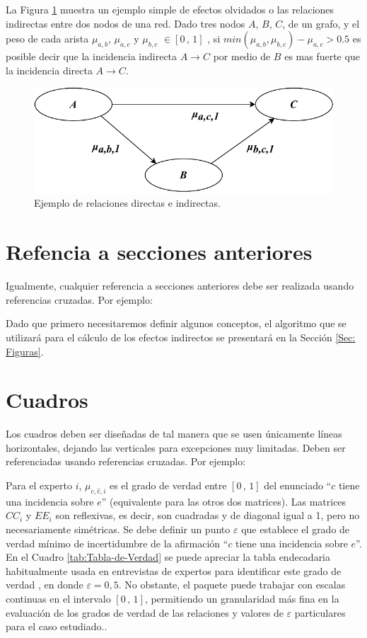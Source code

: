 La Figura \ref{figure: 1d_triangle} muestra un ejemplo simple de efectos olvidados o las relaciones indirectas entre dos nodos de una red. Dado tres nodos $A$, $B$, $C$, de un grafo, y el peso de cada arista $\mu_{a,b}$, $\mu_{a,c}$ y $\mu_{b,c}$ $\in [0\,,\,1]$ , si $min(\mu_{a,b}, \mu_{b,c}) - \mu_{a,c} > 0.5$ es posible decir que la incidencia indirecta $A \rightarrow C$ por medio de $B$ es mas fuerte que la incidencia directa $A \rightarrow C$.
\begin{figure}[H]
  \centering
  \includegraphics[width=\textwidth]{files/1d.pdf}
  \caption{Ejemplo de relaciones directas e indirectas.}
  \label{figure: 1d_triangle}
\end{figure}

\section{Refencia a secciones anteriores}
Igualmente, cualquier referencia a secciones anteriores debe ser realizada usando referencias cruzadas. Por ejemplo:

Dado que primero necesitaremos definir algunos conceptos, el algoritmo que se utilizará para el cálculo de los efectos indirectos se presentará en la Sección \ref{Sec: Figuras}. 

\section{Cuadros}

Los cuadros deben ser diseñadas de tal manera que se usen únicamente líneas horizontales, dejando las verticales para excepciones muy limitadas. Deben ser referenciadas usando referencias cruzadas. Por ejemplo:

Para el experto $i$, $\mu_{c,\hat{e},i}$ es el grado de verdad entre $[0\,,\,1]$ del enunciado ``$c$ tiene una incidencia sobre $e$'' (equivalente para las otros dos matrices). Las matrices $CC_i$ y $EE_i$ son reflexivas, es decir, son cuadradas y de diagonal igual a 1, pero no necesariamente simétricas. Se debe definir un punto $\varepsilon$ que establece el grado de verdad mínimo de incertidumbre de la afirmación ``$c$ tiene una incidencia sobre $e$''. En el Cuadro \ref{tab:Tabla-de-Verdad} se puede apreciar la tabla endecadaria habitualmente usada en entrevistas de expertos para identificar este grado de verdad \parencite{kaufmann1993tecnicas}, en donde $\varepsilon=0,5$. No obstante, el paquete puede trabajar con escalas continuas en el intervalo $[0\,,\,1]$, permitiendo un granularidad más fina en la evaluación de los grados de verdad de las relaciones y valores de $\varepsilon$ particulares para el caso estudiado.. 

